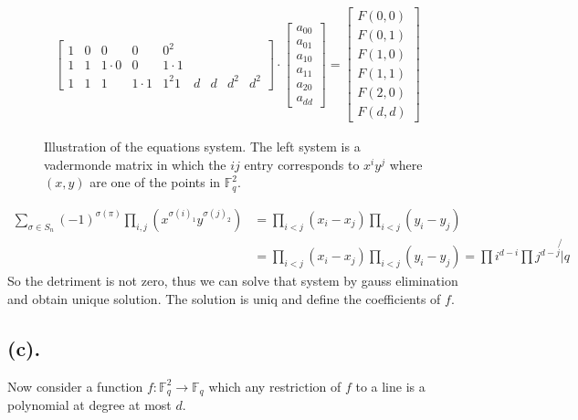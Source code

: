 \documentclass{article}
\newcommand{\FF}{\mathbb{F}}
\begin{document}
\begin{figure}
\begin{equation*}
  \begin{split}
    \begin{bmatrix}
    1 & 0 & 0 &0 &0^{2} \\
    1 & 1 & 1\cdot 0 &0  &1\cdot 1 \\
    1 & 1 & 1 &1 \cdot 1 &1^2
    1 & d & d & d^{2} & d^{2}
    \end{bmatrix}
    \cdot 
    \begin{bmatrix}
      a_{00}  \\
      a_{01}  \\
      a_{10}  \\  
      a_{11}  \\
      a_{20}  \\
      a_{dd}  
    \end{bmatrix}
    = 
   \begin{bmatrix}
     F(0,0)  \\
     F(0,1)  \\
     F(1,0)  \\
     F(1,1)  \\
     F(2,0)  \\
     F(d,d)  
    \end{bmatrix}
  \end{split}
\end{equation*}
\caption{ Illustration of the equations system. The left system is a vadermonde matrix in which the $ij$ entry corresponds to $x^{i}y^{j}$ where $(x,y)$ are one of the points in $\FF_{q}^{2}$.}
\end{figure}

\begin{equation*}
  \begin{split}
    \sum_{\sigma \in S_{n}}{ \left( -1 \right)^{\sigma(\pi)}\prod_{i,j }{( x^{\sigma(i)_{1}}y^{\sigma(j)_{2}}  ) } } &= \prod_{i<j}{\left(x_{i} - x_{j}  \right)}\prod_{i<j}\left(y_{i} -y_{j} \right) \\
  &= \prod_{i<j}{\left(x_{i} - x_{j}  \right)}\prod_{i<j}\left(y_{i} -y_{j} \right) = \prod{i^{d-i}}\prod{j^{d-j}} \not{|} q
\end{split}
\end{equation*}
So the detriment is not zero, thus we can solve that system by gauss elimination and obtain unique solution. The solution is uniq and define the coefficients of $f$.  

\subsection{(c).}

Now consider a function $f : \FF_{q}^{2} \rightarrow \FF_{q}$ which any restriction of $f$ to a line is a polynomial at degree at most $d$.   


  \printbibliography 
\end{document}
